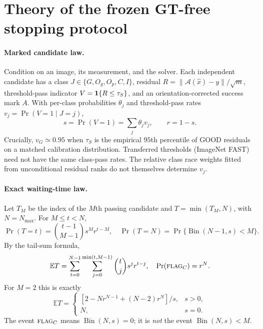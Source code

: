 \section{Theory of the frozen GT-free stopping protocol}
\label{sec:suppl-protocol-theory}

\paragraph{Marked candidate law.}
Condition on an image, its measurement, and the solver. Each independent
candidate has a class $J\in\{G,O_g,O_p,C,I\}$, residual
$R=\|\mathcal A(\hat x)-y\|/\sqrt m$, threshold-pass indicator
$V={\bf1}\{R\le\tau_S\}$, and an orientation-corrected success mark $A$.
With per-class probabilities $\theta_j$ and threshold-pass rates
$v_j=\Pr(V=1\mid J=j)$,
\[
 s=\Pr(V=1)=\sum_j\theta_jv_j,\qquad r=1-s.
\]
Crucially, $v_G\simeq0.95$ when $\tau_S$ is the empirical $95$th
percentile of GOOD residuals on a matched calibration distribution.
Transferred thresholds (ImageNet FAST) need not have the same class-pass
rates. The relative class race weights fitted from unconditional
residual ranks do not themselves determine $v_j$.

\paragraph{Exact waiting-time law.}
Let $T_M$ be the index of the $M$th passing candidate and
$T=\min(T_M,N)$, with $N=N_{\max}$. For $M\le t<N$,
\[
 \Pr(T=t)=\binom{t-1}{M-1}s^M r^{t-M},\quad
 \Pr(T=N)=\Pr\{\operatorname{Bin}(N-1,s)<M\}.
\]
By the tail-sum formula,
\begin{equation}\label{eq:stop-general}
 \mathbb E T=\sum_{t=0}^{N-1}\sum_{j=0}^{\min(t,M-1)}
 \binom tj s^j r^{t-j},\quad
 \Pr(\textsc{flag}_C)=r^N.
\end{equation}
For $M=2$ this is exactly
\begin{equation}\label{eq:stop-M2}
 \mathbb ET=\begin{cases}
 [2-Nr^{N-1}+(N-2)r^N]/s,&s>0,\\
 N,&s=0.
 \end{cases}
\end{equation}
The event $\textsc{flag}_C$ means $\operatorname{Bin}(N,s)=0$;
it is \emph{not} the event $\operatorname{Bin}(N,s)<M$.

